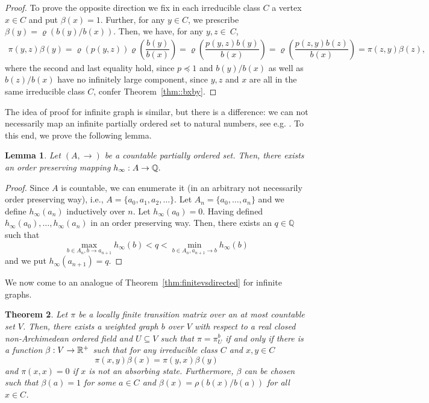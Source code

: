 \documentclass[a4paper,oneside, 12pt]{amsart}
\newtheorem{theorem}{Theorem}
\numberwithin{theorem}{section}
\newtheorem{lemma}[theorem]{Lemma}
\theoremstyle{definition}
\newcommand{\map}{\varrho}
\newcommand{\prob}{\pi}
\newcommand{\rw}{\beta}
\newcommand{\subsV}{U}
\begin{document}
{\begin{proof}
To prove the opposite direction we fix in each  irreducible class $C$ a vertex $x\in C$ and put
 $\rw(x)=1.
$
Further, for any $y\in C$, we prescribe $\rw(y)=\map({b(y)}/{b(x)})$. Then, we have, for any $y,z\in~C$,
\begin{align*}
\prob(y,z) \rw(y)=\map(p(y,z))\map\left(\dfrac{b(y)}{b(x)}\right)=\map\left(\dfrac{p(y,z) b(y)}{b(x)}\right)=\map\left(\dfrac{p(z,y) b(z)}{b(x)}\right)=\prob(z,y) \rw(z),
\end{align*}
where the second and last equality hold, since $p\preceq 1$ and ${b(y)}/{b(x)}$ as well as ${b(z)}/{b(x)}$  have no infinitely large component, since $y,z$  and $ x$ are all in the same irreducible class  $C$, confer Theorem~\ref{thm::bxby}.
\end{proof}

The idea of proof for infinite graph is  similar, but there is a difference: we can not necessarily map an infinite partially ordered set to natural numbers, see e.g. \cite{mathoverflow}.
 To this end, we prove  the following lemma.

\begin{lemma}\label{lemma:mappingDinf}
Let $(A, \to)$ be a countable partially ordered set. Then, there exists an order preserving  mapping
$
h_\infty:A\to \Bbb Q.
$\end{lemma}

\begin{proof}
Since $ A $ is countable, we can enumerate it (in an arbitrary not necessarily order preserving way), i.e., $ A=\{a_{0},a_{1},a_{2},\ldots\} $. 
Let $ A_{n}=\{a_{0},\ldots,a_{n}\} $ and we  define $ h_{\infty}(a_{n}) $ inductively over $ n $. Let 	$ h_{\infty}(a_{0})=0 $. Having defined $ h_{\infty}(a_{0}) ,\ldots, h_{\infty}(a_{n})$ in an order preserving way. Then, there exists an $ q\in \mathbb{Q} $ such that
$$
\max_{b\in A_{n}, b\to a_{n+1}} h_\infty(b)<q< \min_{b\in A_{n}, a_{n+1}\to b} h_\infty(b)
$$
and we put $  h_\infty(a_{n+1})=q $.
\end{proof}

We now come to an analogue of Theorem~\ref{thm:finitevsdirected} for infinite graphs.

\begin{theorem}\label{thm:infinitevsdirected}  Let $ \pi $ be a locally finite  transition matrix over an at most countable set $ V $. Then, there exists a weighted graph $ b $ over $ V $ with respect to a real closed non-Archimedean ordered field and $\subsV\subseteq V$ such that $\pi=\pi_{U}^{b}$ if and only if  there is a function $\rw:V\to \Bbb R^+$ such that 
	for any irreducible class $C$ and  $x,y\in C$ 
	$$
	\prob(x,y)\rw(x)=\prob(y,x)\rw(y)
	$$
	and $ \pi(x,x)=0 $ if $ x $ is not an absorbing state. 	Furthermore, $ \beta $ can be chosen such that $ \beta (a)=1 $ for some $ a\in C $ and $  \beta(x)=\rho (b(x)/b(a)) $ for all $ x\in C $.
\end{theorem}

}
\end{document}
